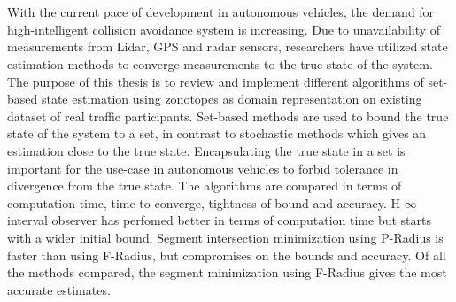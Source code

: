 \chapter{\abstractname}
With the current pace of development in autonomous vehicles, the demand for high-intelligent collision avoidance system is increasing. Due to unavailability of measurements from Lidar, GPS and radar sensors, researchers have utilized state estimation methods to converge measurements to the true state of the system. The purpose of this thesis is to review and implement different algorithms of set-based state estimation using zonotopes as domain representation on existing dataset of real traffic participants. Set-based methods are used to bound the true state of the system to a set, in contrast to stochastic methods which gives an estimation close to the true state. Encapsulating the true state in a set is important for the use-case in autonomous vehicles to forbid tolerance in divergence from the true state. The algorithms are compared in terms of computation time, time to converge, tightness of bound and accuracy. H-$\infty$ interval observer has perfomed better in terms of computation time but starts with a wider initial bound. Segment intersection minimization using P-Radius is faster than using F-Radius, but compromises on the bounds and accuracy. Of all the methods compared, the segment minimization using F-Radius gives the most accurate estimates.
